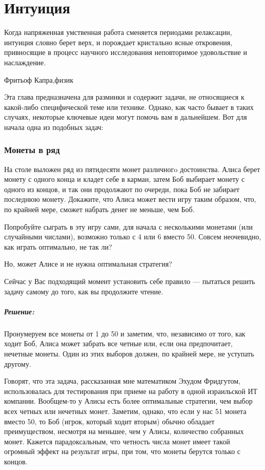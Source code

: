 \chapter*{Интуиция}
                                         

\epigraph{Когда напряженная
умственная  работа  сменяется  периодами  релаксации,  интуиция
словно  берет  верх,  и  порождает кристально ясные откровения,
привносящие  в  процесс  научного   исследования   неповторимое
удовольствие и наслаждение.}{Фритьоф Капра,физик}

Эта глава предназначена для разминки и  содержит задачи, не относящиеся к какой-либо специфической теме или технике. Однако, как часто бывает в таких случаях, некоторые  ключевые идеи могут помочь вам в дальнейшем.  Вот для начала одна из подобных задач:




\subsection*{Монеты в ряд} %


На столе выложен ряд из пятидесяти монет различногo достоинства. Алиса берет монету с одного конца и кладет себе в карман, затем Боб выбирает монету с одного из концов, и так они продолжают по очереди, пока Боб не забирает последнюю монету.
 Докажите, что Алиса может вести игру таким образом, что, по крайней мере, сможет набрать денег не меньше, чем Боб.


Попробуйте сыграть в эту игру сами, для начала с несколькими монетами (или случайными числами), возможно только с 4 или 6 вместо 50. 
Совсем неочевидно, как играть оптимально, не так ли?


Но, может Алисе и не нужна оптимальная стратегия? 


Сейчас у Вас подходящий момент установить себе правило --- пытаться решить задачу самому до того, как вы продолжите чтение.


\paragraph{Решение:}
Пронумеруем все монеты от 1 до 50 и заметим, что, независимо от того, как ходит Боб, Алиса может забрать все четные или, если она предпочитает, нечетные монеты.
Один из этих выборов должен, по крайней мере, не уступать другому.


Говорят, что эта задача, рассказанная мне математиком  Эхудом Фридгутом, использовалась для тестирования при приеме на работу в одной израильской ИТ компании. 
Вообщем-то у Алисы есть более оптимальные стратегии, чем выбор всех четных или нечетных монет.
Заметим, однако, что если у нас 51 монета вместо 50, то Боб (игрок, который ходит вторым) обычно обладает преимуществом, несмотря на меньшее, чем у Алисы, количество собранных монет.  
Кажется парадоксальным, что четность числа монет имеет такой огромный эффект на результат игры, при том, что монеты берутся только с концов.



